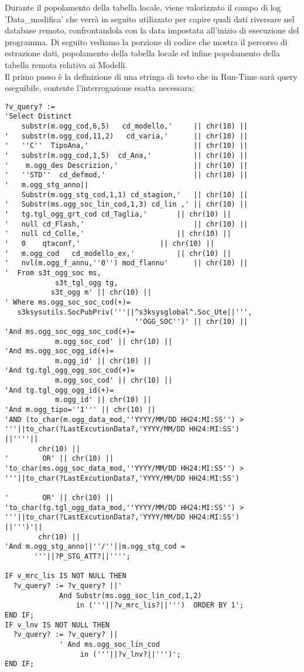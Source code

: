 Durante il popolamento della tabella locale, viene valorizzato il campo di log 'Data\_modifica' che verrà in seguito utilizzato per capire quali dati riversare nel database remoto, confrontandola con la data impostata all'inizio di esecuzione del programma.
Di seguito vediamo la porzione di codice che mostra il percorso di estrazione dati, popolamento della tabella locale ed infine popolamento della tabella remota relativa ai Modelli.\\
Il primo passo è la definizione di una stringa di testo che in Run-Time sarà query eseguibile, contente l'interrogazione esatta necessara:
\begin{lstlisting}[frame=single, style=base]
?v_query? := 
'Select Distinct 
    substr(m.ogg_cod,6,5)   cd_modello,'     || chr(10) ||
'   substr(m.ogg_cod,11,2)   cd_varia,'      || chr(10) ||
'   ''C''  TipoAna,'                         || chr(10) ||
'   substr(m.ogg_cod,1,5)  cd_Ana,'          || chr(10) ||
'    m.ogg_des Descrizion,'                  || chr(10) ||
'   ''STD''  cd_defmod,'                     || chr(10) ||
'   m.ogg_stg_anno||
    Substr(m.ogg_stg_cod,1,1) cd_stagion,'   || chr(10) ||
'   Substr(ms.ogg_soc_lin_cod,1,3) cd_lin ,' || chr(10) ||
'   tg.tgl_ogg_grt_cod cd_Taglia,' 	     || chr(10) ||
'   null cd_Flash,' 	                     || chr(10) ||
'   null cd_Colle,' 		             || chr(10) ||
'   0    qtaconf,' 		             || chr(10) ||
'   m.ogg_cod   cd_modello_ex,' 	     || chr(10) ||
'   nvl(m.ogg_f_annu,''0'') mod_flannu'      || chr(10) ||
'  From s3t_ogg_soc ms,
            s3t_tgl_ogg tg, 
           s3t_ogg m' || chr(10) ||
' Where ms.ogg_soc_soc_cod(+)=
   s3ksysutils.SocPubPriv('''||^s3ksysglobal^.Soc_Ute||''',
                               ''OGG_SOC'')' || chr(10) ||
'And ms.ogg_soc_ogg_soc_cod(+)=
            m.ogg_soc_cod' || chr(10) ||
'And ms.ogg_soc_ogg_id(+)=
            m.ogg_id' || chr(10) ||
'And tg.tgl_ogg_ogg_soc_cod(+)=
            m.ogg_soc_cod' || chr(10) ||
'And tg.tgl_ogg_ogg_id(+)=
            m.ogg_id' || chr(10) ||
'And m.ogg_tipo=''1''' || chr(10) ||
'AND (to_char(m.ogg_data_mod,''YYYY/MM/DD HH24:MI:SS'') >
'''||to_char(?LastExcutionData?,'YYYY/MM/DD HH24:MI:SS')
||''''||
        chr(10) ||
'        OR' || chr(10) ||
'to_char(ms.ogg_soc_data_mod,''YYYY/MM/DD HH24:MI:SS'') >
'''||to_char(?LastExcutionData?,'YYYY/MM/DD HH24:MI:SS')

'        OR' || chr(10) ||
'to_char(tg.tgl_ogg_data_mod,''YYYY/MM/DD HH24:MI:SS'') >
'''||to_char(?LastExcutionData?,'YYYY/MM/DD HH24:MI:SS')
||''')'||
        chr(10) ||
'And m.ogg_stg_anno||''/''||m.ogg_stg_cod =
       '''||?P_STG_ATT?||'''';

IF v_mrc_lis IS NOT NULL THEN
  ?v_query? := ?v_query? ||'
             And Substr(ms.ogg_soc_lin_cod,1,2)
                 in ('''||?v_mrc_lis?||''')  ORDER BY 1';
END IF;
IF v_lnv IS NOT NULL THEN
  ?v_query? := ?v_query? ||
             ' And ms.ogg_soc_lin_cod 
                  in ('''||?v_lnv?||''')';  
END IF;
\end{lstlisting}
